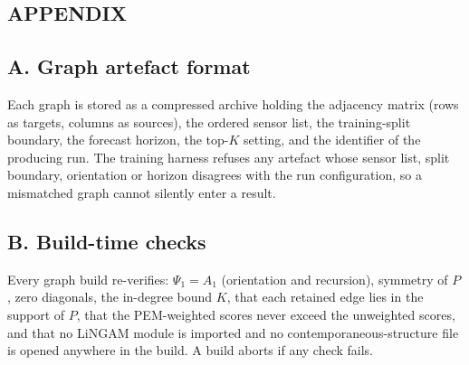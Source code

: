\documentclass[MTech]{ugthesis}
\begin{document}

\nocite{*}
\begin{singlespace}
\end{singlespace}
\appendix

\begin{appendices}
\chapter*{APPENDIX}
\section*{A. Graph artefact format}
Each graph is stored as a compressed archive holding the adjacency matrix (rows as targets, columns as sources), the ordered sensor list, the training-split boundary, the forecast horizon, the top-$K$ setting, and the identifier of the producing run. The training harness refuses any artefact whose sensor list, split boundary, orientation or horizon disagrees with the run configuration, so a mismatched graph cannot silently enter a result.

\section*{B. Build-time checks}
Every graph build re-verifies: $\Psi_1 = A_1$ (orientation and recursion), symmetry of $P$, zero diagonals, the in-degree bound $K$, that each retained edge lies in the support of $P$, that the PEM-weighted scores never exceed the unweighted scores, and that no LiNGAM module is imported and no contemporaneous-structure file is opened anywhere in the build. A build aborts if any check fails.
\end{appendices}
  
\end{document}
